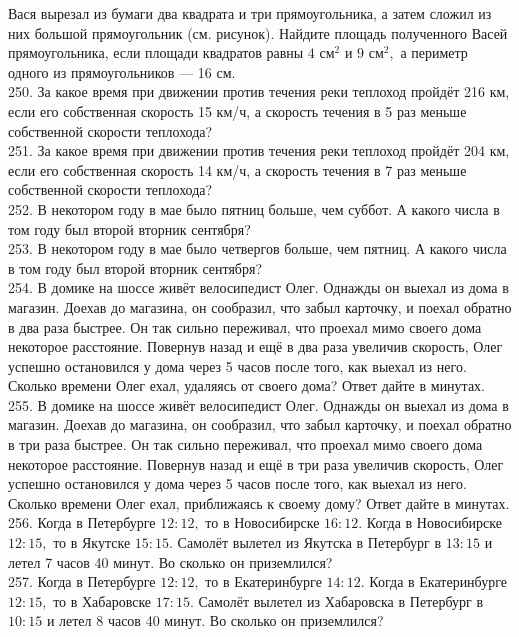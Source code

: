 Вася вырезал из бумаги два квадрата и три прямоугольника, а затем сложил из них большой прямоугольник (см. рисунок). Найдите площадь  полученного Васей прямоугольника, если площади квадратов равны $4\text{ см}^2$ и $9\text{ см}^2,$ а периметр одного из прямоугольников --- 16 см.\\
250. За какое время при движении против течения реки теплоход пройдёт 216 км, если его собственная скорость 15 км/ч, а скорость течения в 5 раз меньше собственной скорости теплохода?\\
251. За какое время при движении против течения реки теплоход пройдёт 204 км, если его собственная скорость 14 км/ч, а скорость течения в 7 раз меньше собственной скорости теплохода?\\
252. В некотором году в мае было пятниц больше, чем суббот. А какого числа в том году был второй вторник сентября?\\
253. В некотором году в мае было четвергов больше, чем пятниц. А какого числа в том году был второй вторник сентября?\\
254. В домике на шоссе живёт велосипедист Олег. Однажды он выехал из дома в магазин. Доехав до магазина, он сообразил, что забыл карточку, и поехал обратно в два раза быстрее. Он так сильно переживал, что проехал мимо своего дома некоторое расстояние. Повернув назад и ещё в два раза увеличив скорость, Олег успешно остановился у дома через 5 часов после того, как выехал из него. Сколько времени Олег ехал, удаляясь от своего дома? Ответ дайте в минутах.\\
255. В домике на шоссе живёт велосипедист Олег. Однажды он выехал из дома в магазин. Доехав до магазина, он сообразил, что забыл карточку, и поехал обратно в три раза быстрее. Он так сильно переживал, что проехал мимо своего дома некоторое расстояние. Повернув назад и ещё в три раза увеличив скорость, Олег успешно остановился у дома через 5 часов после того, как выехал из него. Сколько времени Олег ехал, приближаясь к своему дому? Ответ дайте в минутах.\\
256. Когда в Петербурге $12:12,$ то в Новосибирске $16:12.$ Когда в Новосибирске $12:15,$ то в Якутске $15:15.$ Самолёт вылетел из Якутска в Петербург в $13:15$ и летел 7 часов 40 минут. Во сколько он приземлился?\\
257. Когда в Петербурге $12:12,$ то в Екатеринбурге $14:12.$ Когда в Екатеринбурге $12:15,$ то в Хабаровске $17:15.$ Самолёт вылетел из Хабаровска в Петербург в $10:15$ и летел 8 часов 40 минут. Во сколько он приземлился?\\
